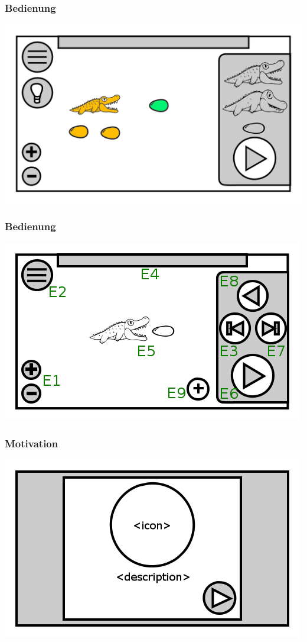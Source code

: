\documentclass[t]{beamer}
\begin{document}
\begin{frame}
	\frametitle{Bedienung}
	\includegraphics[height=\textheight]{level_colored_croc2.png}
\end{frame}
\begin{frame}
	\frametitle{Bedienung}
	\includegraphics[height=\textheight]{level_simulation.png}
\end{frame}
\begin{frame}
	\frametitle{Motivation}
	\includegraphics[height=\textheight]{achievement_notification.png}
\end{frame}
\end{document}
